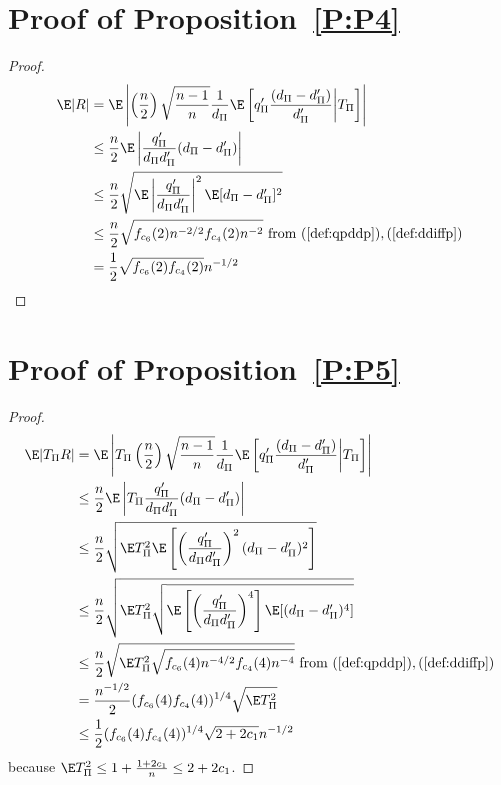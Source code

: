 \section{Proof of Proposition~\ref{P:P4}}
\begin{proof}
  \begin{align*}
    \E|R| &= \E \left | \left (\frac{n}{2}\right )
      \sqrt{\frac{n-1}{n}}\frac{1}{d_{\Pi}}\E
      \left [q_{\Pi}'\frac{(d_{\Pi}-d_{\Pi}')}{d_{\Pi}'} \middle | T_{\Pi} \right ]\right | \\
    &\leq \frac{n}{2} \E \left | \frac{q_{\Pi}'}{d_{\Pi}d_{\Pi}'}(d_{\Pi}-d_{\Pi}') \right | \\
    &\leq \frac{n}{2} \sqrt{\E \left | \frac{q_{\Pi}'}{d_{\Pi}d_{\Pi}'} \right |^2
      \E[d_{\Pi}-d_{\Pi}']^2} \\
    &\leq \frac{n}{2} \sqrt{f_{c_6}(2) n^{-2/2} f_{c_4}(2) n^{-2}}
    \text{ from } (\ref{def:qpddp}), (\ref{def:ddiffp}) \\
    &=\frac{1}{2}\sqrt{f_{c_6}(2)f_{c_4}(2)} n^{-1/2}
  \end{align*}
\end{proof}

\section{Proof of Proposition~\ref{P:P5}}
\begin{proof}
  \begin{align*}
    \E|T_{\Pi}R| &= \E \left | T_{\Pi} \left (\frac{n}{2}\right )
      \sqrt{\frac{n-1}{n}}\frac{1}{d_{\Pi}}\E
      \left [q_{\Pi}'\frac{(d_{\Pi}-d_{\Pi}')}{d_{\Pi}'} \middle | T_{\Pi} \right ]\right | \\
    &\leq \frac{n}{2} \E \left |T_{\Pi} \frac{q_{\Pi}'}{d_{\Pi}d_{\Pi}'}(d_{\Pi}-d_{\Pi}') \right | \\
    &\leq \frac{n}{2} \sqrt{\E T_{\Pi}^2 \E \left [ \left ( \frac{q_{\Pi}'}{d_{\Pi}d_{\Pi}'} \right )^2
        (d_{\Pi}-d_{\Pi}')^2 \right ] } \\
    &\leq \frac{n}{2} \sqrt{\E T_{\Pi}^2 \sqrt{\E \left [ \left ( \frac{q_{\Pi}'}{d_{\Pi}d_{\Pi}'}
          \right )^4 \right ] \E[(d_{\Pi}-d_{\Pi}')^4] }} \\
    &\leq \frac{n}{2} \sqrt{\E T_{\Pi}^2 \sqrt{f_{c_6}(4) n^{-4/2} f_{c_4}(4) n^{-4}}}
    \text{ from } (\ref{def:qpddp}), (\ref{def:ddiffp}) \\
    &=\frac{n^{-1/2}}{2}(f_{c_6}(4)f_{c_4}(4))^{1/4}\sqrt{\E T_{\Pi}^2} \\
    &\leq \frac{1}{2}(f_{c_6}(4)f_{c_4}(4))^{1/4} \sqrt{2+2c_1} n^{-1/2}
  \end{align*}
  because $\E T_{\Pi}^2 \leq 1 + \frac{1+2c_1}{n} \leq 2 + 2c_1$.
\end{proof}